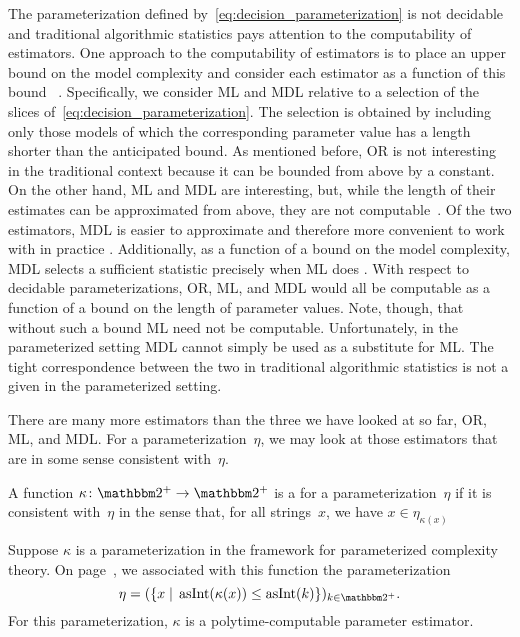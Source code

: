 The parameterization defined by~\eqref{eq:decision_parameterization} is not decidable and traditional algorithmic statistics pays attention to the computability of estimators.
One approach to the computability of estimators is to place an upper bound on the model complexity and consider each estimator as a function of this bound~\parencite{gacs2001algorithmic,vereshchagin2004kolmogorov} \parencite[in the presence of resource bounds,][]{milovanov2017algorithmic}.
Specifically, we consider ML and MDL relative to a selection of the slices of~\eqref{eq:decision_parameterization}.
The selection is obtained by including only those models of which the corresponding parameter value has a length shorter than the anticipated bound.
As mentioned before, OR is not interesting in the traditional context because it can be bounded from above by a constant.
On the other hand, ML and MDL are interesting, but, while the length of their estimates can be approximated from above, they are not computable~\parencite{vereshchagin2004kolmogorov}.
Of the two estimators, MDL is easier to approximate and therefore more convenient to work with in practice \parencite[Section~V.B]{vereshchagin2004kolmogorov}.
Additionally, as a function of a bound on the model complexity, MDL selects a sufficient statistic precisely when ML does \parencite[Lemma~IV.2]{vereshchagin2004kolmogorov}.
With respect to decidable parameterizations, OR, ML, and MDL would all be computable as a function of a bound on the length of parameter values.
Note, though, that without such a bound ML need not be computable.
Unfortunately, in the parameterized setting MDL cannot simply be used as a substitute for ML.
The tight correspondence between the two in traditional algorithmic statistics is not a given in the parameterized setting.

There are many more estimators than the three we have looked at so far, OR, ML, and MDL.
For a parameterization~$\eta$, we may look at those estimators that are in some sense consistent with~$\eta$.
\begin{definition}
  A function $\kappa\colon \binary^+ \to \binary^+$ is a  for a parameterization~$\eta$ if it is consistent with~$\eta$ in the sense that, for all strings~$x$, we have $x \in \eta_{\kappa(x)}$
\end{definition}
\begin{example}
  Suppose $\kappa$ is a parameterization in the \citeauthor{flum2006parameterized} framework for parameterized complexity theory.
  On page~\pageref{eq:flum_parameterization}, we associated with this function the parameterization
  \begin{equation*}
    \eta \deq (\{x \st \asNat(\kappa(x)) \le \asNat(k)\})_{k \in \binary^+}.
  \end{equation*}
  For this parameterization, $\kappa$ is a polytime-computable parameter estimator.
\end{example}

